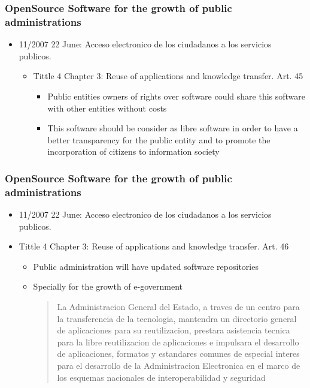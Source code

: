 \documentclass{beamer}
\begin{document}
\begin{frame}
\frametitle{ OpenSource Software for the growth of public administrations}

\begin{itemize}
\item 11/2007 22 June: Acceso electronico de los ciudadanos a los servicios publicos. 

\begin{itemize}
	\item Tittle 4 Chapter 3: Reuse of applications and knowledge transfer. Art. 45
	\begin{itemize}
		\item Public entities owners of rights over software could share this software with other entities without costs
		\item This software should be consider as libre software in order to have a better transparency for the public entity and to promote the incorporation of citizens to information society
	\end{itemize}

\end{itemize}


\end{itemize}

\end{frame}

\begin{frame}
\frametitle{ OpenSource Software for the growth of public administrations}

\begin{itemize}
\item 11/2007 22 June: Acceso electronico de los ciudadanos a los servicios publicos. 

	\item Tittle 4 Chapter 3: Reuse of applications and knowledge transfer. Art. 46	
	\begin{itemize}
		\item Public administration will have updated software repositories 
		\item Specially for the growth of e-government 
		\begin{quote}
La Administracion General del Estado, a traves de un centro
para la transferencia de la tecnologia, mantendra un directorio
general de aplicaciones para su reutilizacion, prestara asistencia
tecnica para la libre reutilizacion de aplicaciones e impulsara el
desarrollo de aplicaciones, formatos y estandares comunes de
especial interes para el desarrollo de la Administracion
Electronica en el marco de los esquemas nacionales de
interoperabilidad y seguridad

		\end{quote}
	\end{itemize}


\end{itemize}

\end{frame}
\end{document}
